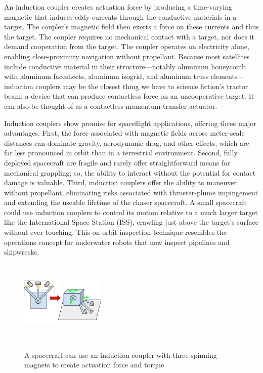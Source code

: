 \documentclass{article}
\begin{document}
An induction coupler creates actuation force by producing a time-varying magnetic that induces eddy-currents  through the conductive materials in a target. The coupler’s magnetic field then exerts a force on these currents and thus the target. The coupler requires no mechanical contact with a target, nor does it demand cooperation from the target. The coupler operates on electricity alone, enabling close-proximity navigation without propellant. Because most satellites include conductive material in their structure—notably aluminum honeycomb with aluminum facesheets, aluminum isogrid, and aluminum truss elements—induction couplers may be the closest thing we have to science fiction's tractor beam: a device that can produce contactless force on an uncooperative target. It can also be thought of as a contactless momentum-transfer actuator.

Induction couplers show promise for spaceflight applications, offering three major advantages. First, the force associated with magnetic fields across meter-scale distances can dominate gravity, aerodynamic drag, and other effects, which are far less pronounced in orbit than in a terrestrial environment. Second, fully deployed spacecraft are fragile and rarely offer straightforward means for mechanical grappling; so, the ability to interact without the potential for contact damage is valuable. Third, induction couplers offer the ability to maneuver without propellant, eliminating risks associated with thruster-plume impingement \cite{BaerwaldR.S.1977}
and extending the useable lifetime of the chaser spacecraft.
A small spacecraft could use induction couplers to control its motion relative to a much larger target like the International Space Station (ISS), crawling just above the target’s surface without ever touching. This on-orbit inspection technique resembles the operations concept for underwater robots that now inspect pipelines and shipwrecks. \cite{Whitcomb2000}

\begin{figure}
\includegraphics[width = 4cm, height = 4cm ]{figures/Induction_Coupler_Overview_Diagram.jpg}
\label{fig:inspector_diagram}
\caption{A spacecraft can use an induction coupler with three spinning magnets to create actuation force and torque}
\end{figure}
 
\end{document}
